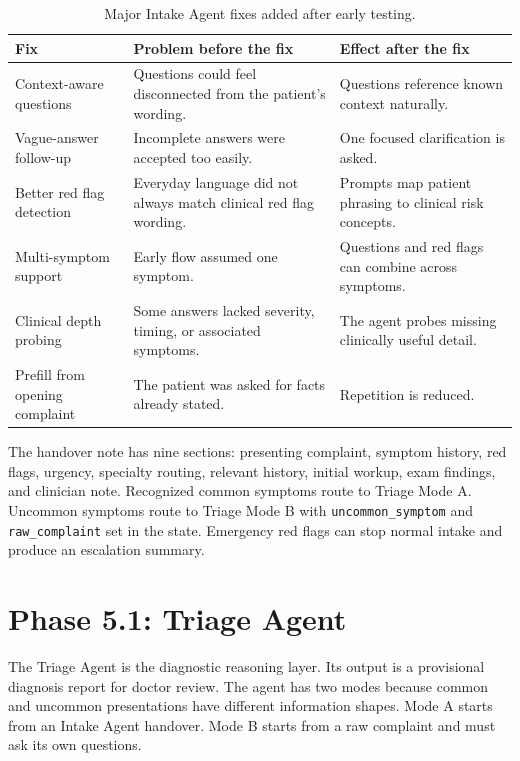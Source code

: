 \begin{table}[htbp]
\centering
\caption{Major Intake Agent fixes added after early testing.}
\label{tab:intake_fixes}
\begin{tabular}{p{} p{} p{}}
\toprule
\textbf{Fix} & \textbf{Problem before the fix} & \textbf{Effect after the fix}\\
\midrule
Context-aware questions & Questions could feel disconnected from the patient's wording. & Questions reference known context naturally.\\
Vague-answer follow-up & Incomplete answers were accepted too easily. & One focused clarification is asked.\\
Better red flag detection & Everyday language did not always match clinical red flag wording. & Prompts map patient phrasing to clinical risk concepts.\\
Multi-symptom support & Early flow assumed one symptom. & Questions and red flags can combine across symptoms.\\
Clinical depth probing & Some answers lacked severity, timing, or associated symptoms. & The agent probes missing clinically useful detail.\\
Prefill from opening complaint & The patient was asked for facts already stated. & Repetition is reduced.\\
\bottomrule
\end{tabular}
\end{table}

The handover note has nine sections: presenting complaint, symptom history, red flags, urgency, specialty routing, relevant history, initial workup, exam findings, and clinician note. Recognized common symptoms route to Triage Mode A. Uncommon symptoms route to Triage Mode B with \texttt{uncommon\_symptom} and \texttt{raw\_complaint} set in the state. Emergency red flags can stop normal intake and produce an escalation summary.

\section{Phase 5.1: Triage Agent}

The Triage Agent is the diagnostic reasoning layer. Its output is a provisional diagnosis report for doctor review. The agent has two modes because common and uncommon presentations have different information shapes. Mode A starts from an Intake Agent handover. Mode B starts from a raw complaint and must ask its own questions.

